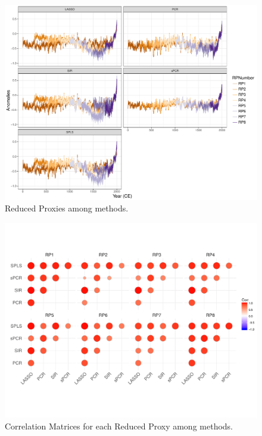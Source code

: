 \documentclass[11pt]{amsart}
\theoremstyle{plain}
\theoremstyle{definition}
\theoremstyle{remark}
\begin{document}
\begin{figure}[H]
  \centering
 \includegraphics[scale=0.38]{RPs_type} 
  \caption{Reduced Proxies among methods.}
  \label{fig:RPs}
\end{figure}


\begin{figure}[H]
  \centering
 \includegraphics[scale=0.38]{CorMatrixRPs} 
  \caption{Correlation Matrices for each Reduced Proxy among methods.}
  \label{fig:CorrRPs}
\end{figure}
\end{document}

